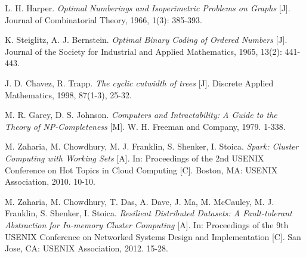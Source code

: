 \begin{thebibliography}{99}
	L. H. Harper.
	\emph{Optimal Numberings and Isoperimetric Problems on Graphs} [J].
	Journal of Combinatorial Theory, 1966, 1(3): 385-393.

	K. Steiglitz, A. J. Bernstein.
	\emph{Optimal Binary Coding of Ordered Numbers} [J].
	Journal of the Society for Industrial and Applied Mathematics,
	1965, 13(2): 441-443.

	J. D. Chavez, R. Trapp.
	\emph{The cyclic cutwidth of trees} [J].
	Discrete Applied Mathematics, 1998, 87(1-3), 25-32.

	M. R. Garey, D. S. Johnson.
	\emph{Computers and Intractability: A Guide to the Theory of NP-Completeness} [M].
	W. H. Freeman and Company, 1979. 1-338.

	M. Zaharia, M. Chowdhury, M. J. Franklin, S. Shenker, I. Stoica.
	\emph{Spark: Cluster Computing with Working Sets} [A].
	In: Proceedings of the 2nd USENIX Conference on Hot Topics in Cloud Computing [C].
	Boston, MA: USENIX Association, 2010. 10-10.

	M. Zaharia, M. Chowdhury, T. Das, A. Dave, J. Ma,
	M. McCauley, M. J. Franklin, S. Shenker, I. Stoica.
	\emph{Resilient Distributed Datasets: A Fault-tolerant Abstraction for
	In-memory Cluster Computing} [A].
	In: Proceedings of the 9th USENIX Conference on Networked Systems Design and Implementation [C].
	San Jose, CA: USENIX Association, 2012. 15-28.

\end{thebibliography}
